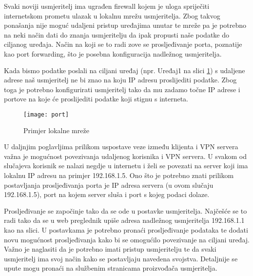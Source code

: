 \hfill \bigbreak
Svaki noviji usmjeritelj ima ugrađen firewall kojem je uloga spriječiti internetskom prometu ulazak u lokalnu mrežu usmjeritelja. Zbog takvog ponašanja nije moguć udaljeni pristup uređajima unutar te mreže pa je potrebno na neki način dati do znanja usmjeritelju da ipak propusti naše podatke do ciljanog uređaja. Način na koji se to radi zove se prosljeđivanje porta, poznatije kao port forwarding, što je posebna konfiguracija nadležnog usmjeritelja.

Kada bismo podatke poslali na ciljani uređaj (npr. Uređaj1 na slici \ref{fig:port}) s udaljene adrese naš usmjeritelj ne bi znao na koju IP adresu proslijediti podatke. Zbog toga je potrebno konfigurirati usmjeritelj tako da mu zadamo točne IP adrese i portove na koje će proslijediti podatke koji stignu s interneta. 
\begin{figure}[h!]
	\centering
     \texttt{[image: port]}
     \caption{Primjer lokalne mreže}
     \label{fig:port}
\end{figure}
\FloatBarrier
\smallbreak
U daljnjim poglavljima prilikom uspostave veze između klijenta i VPN servera važna je mogućnost povezivanja udaljenog korisnika i VPN servera. U svakom od slučajeva korisnik se nalazi negdje u internetu i želi se povezati na server koji ima lokalnu IP adresu na primjer 192.168.1.5. Ono što je potrebno znati prilikom postavljanja prosljeđivanja porta je IP adresa servera (u ovom slučaju 192.168.1.5), port na kojem server sluša i port s kojeg podaci dolaze.

Prosljeđivanje se započinje tako da se ode u postavke usmjeritelja. Najčešće se to radi tako da se u web preglednik upiše adresa nadležnog usmjeritelja 192.168.1.1 kao na slici. U postavkama je potrebno pronaći prosljeđivanje podataka te dodati novu mogućnost prosljeđivanja kako bi se omogućilo povezivanje na ciljani uređaj. Važno je naglasiti da je potrebno imati pristup usmjeritelju te da svaki usmjeritelj ima svoj način kako se postavljaju navedena svojstva. Detaljnije se upute mogu pronaći na službenim stranicama proizvođača usmjeritelja.
